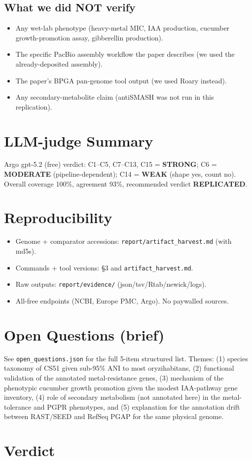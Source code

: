\documentclass[11pt]{article}
\begin{document}
\subsection{What we did NOT verify}

\begin{itemize}[leftmargin=*]
\item Any wet-lab phenotype (heavy-metal MIC, IAA production, cucumber
growth-promotion assay, gibberellin production).
\item The specific PacBio assembly workflow the paper describes (we used the
already-deposited assembly).
\item The paper's BPGA pan-genome tool output (we used Roary instead).
\item Any secondary-metabolite claim (antiSMASH was not run in this
replication).
\end{itemize}

\section{LLM-judge Summary}

Argo gpt-5.2 (free) verdict: C1--C5, C7--C13, C15 = \textbf{STRONG}; C6 =
\textbf{MODERATE} (pipeline-dependent); C14 = \textbf{WEAK} (shape yes, count
no). Overall coverage 100\%, agreement 93\%, recommended verdict
\textbf{REPLICATED}.

\section{Reproducibility}

\begin{itemize}[leftmargin=*]
\item Genome + comparator accessions: \texttt{report/artifact\_harvest.md}
(with md5s).
\item Commands + tool versions: \S 3 and \texttt{artifact\_harvest.md}.
\item Raw outputs: \texttt{report/evidence/} (json/tsv/Rtab/newick/logs).
\item All-free endpoints (NCBI, Europe PMC, Argo). No paywalled sources.
\end{itemize}

\section{Open Questions (brief)}

See \texttt{open\_questions.json} for the full 5-item structured list. Themes:
(1) species taxonomy of CS51 given sub-95\% ANI to most oryzihabitans, (2)
functional validation of the annotated metal-resistance genes, (3) mechanism
of the phenotypic cucumber growth promotion given the modest IAA-pathway gene
inventory, (4) role of secondary metabolism (not annotated here) in the
metal-tolerance and PGPR phenotypes, and (5) explanation for the annotation
drift between RAST/SEED and RefSeq PGAP for the same physical genome.

\section{Verdict}

\begin{center}
\end{center}
\end{document}
